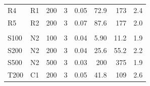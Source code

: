 \begin{table}[htbp]
\begin{tabular}{l>{\raggedright\arraybackslash}p{}rrrrrr}
R4 & R1 & 200 & 3 & 0.05 & 72.9 & 173 & 2.4 \\
R5 & R2 & 200 & 3 & 0.07 & 87.6 & 177 & 2.0 \\
\addlinespace
\multicolumn{8}{l}{\textit{Larger networks}} \\
S100 & N2 & 100 & 3 & 0.04 & 5.90 & 11.2 & 1.9 \\
S200 & N2 & 200 & 3 & 0.04 & 25.6 & 55.2 & 2.2 \\
S500 & N2 & 500 & 3 & 0.03 & 200 & 375 & 1.9 \\
T200 & C1 & 200 & 3 & 0.05 & 41.8 & 109 & 2.6 \\
\bottomrule
\end{tabular}

\end{table}
